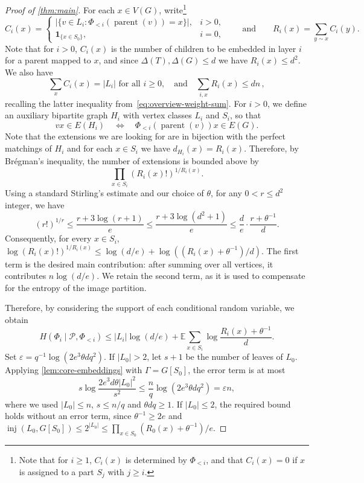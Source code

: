 \documentclass[10pt,a4paper]{amsart}
\numberwithin{equation}{section}
\theoremstyle{definition}
\theoremstyle{remark}
\DeclareMathOperator{\parent}{parent}
\DeclareMathOperator{\inj}{inj}
\begin{document}
\begin{proof}[Proof of \cref{thm:main}]
For each $x\in V(G)$, write\footnote{Note that for $i \geq 1$, $C_i(x)$ is determined by $\Phi_{<i}$, and that $C_i(x) =0$ if $x$ is assigned to a part $S_j$ with $j \geq i$.} 
\[
C_i(x)=
\begin{cases}
\bigl|\{v\in L_i:\Phi_{<i}(\parent(v))=x\}\bigr|, & i>0,\\
\mathbf{1}_{\{x\in S_0\}}, & i=0,
\end{cases}
\qquad\text{and}\qquad
R_i(x)=\sum_{y\sim x}C_i(y).
\]
Note that for $i>0$, $C_i(x)$ is the number of children to be embedded in layer $i$ for a parent mapped to $x$, and since $\Delta(T),\Delta(G)\leq d$ we have $R_i(x)\leq d^2$. We also have
$$\sum_xC_i(x)=|L_i|\text{ for all }i\geq 0,\quad \text{and}\quad \sum_{i,x}R_i(x)\leq dn\,,$$
recalling the latter inequality from~\eqref{eq:overview-weight-sum}.
For $i>0$, we define an auxiliary bipartite graph $H_i$ with vertex classes $L_i$ and $S_i$, so that
$$vx\in E(H_i) \quad \Longleftrightarrow \quad \Phi_{<i}(\parent(v))x\in E(G).$$
Note that the extensions we are looking for are in bijection with the perfect matchings of $H_i$ and for each $x\in S_i$ we have $d_{H_i}(x)=R_i(x)$. Therefore, by Brégman's inequality, the number of extensions is bounded above by
$$\prod_{x\in S_i}(R_i(x)!)^{1/R_i(x)}.$$
Using a standard Stirling's estimate and our choice of $\theta$, for any $0<r\leq d^2$ integer, we have 
$$(r!)^{1/r}\leq \frac{r+3\log(r+1)}{e}\leq \frac{r+3\log(d^2+1)}{e}\leq \frac{d}{e}\cdot \frac{r+\theta^{-1}}{d}.$$
Consequently, for every $x \in S_i$,
$
     \log \left(R_i(x)! \right)^{1/R_i(x)} \leq \log (d/e) + \log ((R_i(x)+\theta^{-1})/d).
$
The first term is the desired main contribution: after summing over all vertices, it contributes $n \log (d/e)$. We retain the second term, as it is used to compensate for the entropy of the image partition. 

Therefore, by considering the support of each conditional random variable, we obtain
\begin{equation}\label{eqn:layerentropy}
    H(\Phi_i\mid\mathcal{P},\Phi_{<i})\leq |L_i|\log\left(d/e\right)+
    \mathbb{E}\sum_{x\in S_i}\log\frac{R_i(x)+\theta^{-1}}{d}.
\end{equation}
Set $\varepsilon=q^{-1}\log(2e^3\theta dq^2)$.
If $|L_0|>2$, let $s+1$ be the number of leaves of $L_0$.
Applying \cref{lem:core-embeddings} with $\Gamma=G[S_0]$,
the error term is at most
$$
s\log\frac{2e^3d\theta |L_0|^2}{s^2}
\le \frac nq\log(2e^3\theta dq^2)
=\varepsilon n,
$$
where we used $|L_0|\le n$, $s\le n/q$ and $\theta dq\ge1$.
If $|L_0|\leq 2$, the required bound holds without an error term,
since $\theta^{-1}\ge2e$ and $\inj(L_0,G[S_0])\leq 2^{|L_0|}\leq \prod_{x\in S_0}(R_0(x)+\theta^{-1})/e.$


\end{proof}
\end{document}

